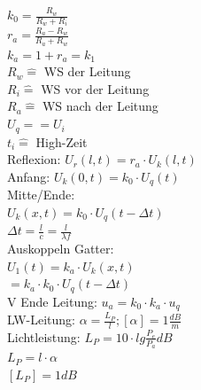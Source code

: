 \documentclass[8pt]{extarticle}
\begin{document}
\begin{minipage}{0.33\textwidth}
$k_0 = \frac{R_w}{R_w + R_i} $\\
$r_a = \frac{R_a - R_w}{R_a + R_w} $\\
$k_a = 1 + r_a = k_1$\\
$R_w \hat{=}$ WS der Leitung\\
$R_i \hat{=}$ WS vor der Leitung\\
$R_a \hat{=}$ WS nach der Leitung\\
$U_q == U_i$\\
$t_i \hat{=}$ High-Zeit\\
Reflexion: $U_r(l,t) = r_a \cdot U_k(l,t)$\\
Anfang: $U_k(0,t)=k_0 \cdot U_{q}(t)$\\
Mitte/Ende:\\
\phantom{ss} $U_k(x,t)= k_0 \cdot U_{q}(t-\Delta t)$\\
\phantom{sss}$\Delta t = \frac{l}{c} = \frac{l}{\lambda f}$\\
Auskoppeln Gatter:\\
\phantom{ss} $U_1(t) = k_a \cdot U_k(x,t) $\\
\phantom{sssssssiiii}$= k_a\cdot k_0 \cdot U_q(t-\Delta t)$\\
V Ende Leitung: $u_a = k_0 \cdot k_a \cdot u_q$\\

LW-Leitung: $\alpha = \frac{L_P}{l}; [\alpha] = 1 \frac{dB}{m}$\\
Lichtleistung: $L_P = 10 \cdot lg\frac{P_e}{P_a} dB$\\
\phantom{sssssississsssss} $L_P = l \cdot \alpha$\\
\phantom{sssssississsssss}$ [L_P] = 1dB$\\



\end{minipage}%
~~~~~~
\end{document}
